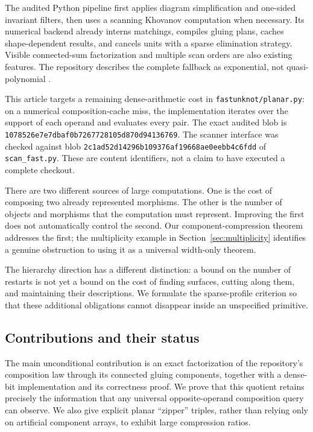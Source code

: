 \documentclass[11pt,letterpaper]{article}
\theoremstyle{definition}
\theoremstyle{remark}
\begin{document}
The audited Python pipeline first applies diagram simplification and
one-sided invariant filters, then uses a scanning Khovanov computation when
necessary. Its numerical backend already interns matchings, compiles gluing
plans, caches shape-dependent results, and cancels units with a sparse
elimination strategy. Visible connected-sum factorization and multiple scan
orders are also existing features. The repository describes the complete
fallback as exponential, not quasi-polynomial \cite{repo}.

This article targets a remaining dense-arithmetic cost in
\texttt{fastunknot/planar.py}: on a numerical composition-cache miss, the
implementation iterates over the support of each operand and evaluates every
pair. The exact audited blob is
\texttt{1078526e7e7dbaf0b7267728105d870d94136769}.
The scanner interface was checked against blob
\texttt{2c1ad52d14296b109376af19668ae0eebb4c6fdd} of
\texttt{scan\_fast.py}. These are content identifiers, not a claim to have
executed a complete checkout.

There are two different sources of large computations. One is the cost of
composing two already represented morphisms. The other is the number of
objects and morphisms that the computation must represent. Improving the
first does not automatically control the second. Our component-compression
theorem addresses the first; the multiplicity example in
Section~\ref{sec:multiplicity} identifies a genuine obstruction to using it
as a universal width-only theorem.

The hierarchy direction has a different distinction: a bound on the number
of restarts is not yet a bound on the cost of finding surfaces, cutting along
them, and maintaining their descriptions. We formulate the sparse-profile
criterion so that these additional obligations cannot disappear inside an
unspecified primitive.

\subsection{Contributions and their status}
The main unconditional contribution is an exact factorization of the
repository's composition law through its connected gluing components,
together with a dense-bit implementation and its correctness proof.
We prove that this quotient retains precisely the information that any
universal opposite-operand composition query can observe. We also give
explicit planar ``zipper'' triples, rather than relying only on artificial
component arrays, to exhibit large compression ratios.
\end{document}
